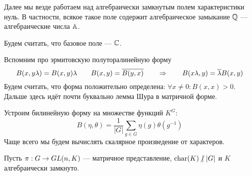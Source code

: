 

Далее мы везде работаем над алгебраически замкнутым полем характеристики нуль.
В частности, всякое такое поле содержит алгебраическое замыкание $\mathbb{Q}$ --- алгебраические числа $\mathbb{A}$.


Будем считать, что базовое поле --- $\mathbb{C}$.

Вспомним про эрмитовскую полуторалинейную форму
\[B(x, y\lambda) = B(x, y)\lambda \qquad B(x, y) = \overline{B(y, x)} \qquad \Rightarrow \qquad B(x\lambda, y) = \overline{\lambda}B(x, y)\]
Будем считать, что форма положительно определена: $\forall x \ne 0: B(x, x) > 0$.
Дальше здесь идёт почти буквально лемма Шура в матричной форме.

Устроим билинейную форму на множестве функций $K^G$:
\[B(\eta, \theta) = \frac{1}{|G|}\sum\limits_{g \in G}\eta(g)\theta(g^{-1})\]
Чаще всего мы будем вычислять скалярное произведение от характеров.

Пусть $\pi: G \rightarrow GL(n, K)$ --- матричное представление, $\operatorname{char}(K) \;\!{\not|}~ |G|$ и $K$ алгебраически замкнуто.

